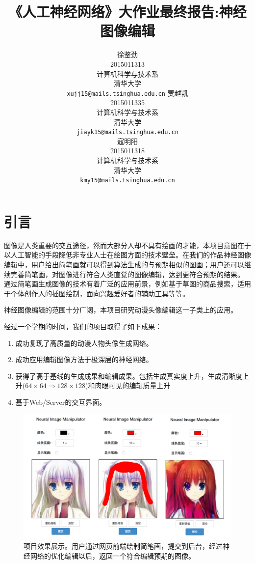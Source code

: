 \documentclass[a4paper,12pt,UTF8]{ctexart}
\title{《人工神经网络》大作业最终报告:神经图像编辑}
\author{
  徐鉴劲 \\
  2015011313 \\
  计算机科学与技术系 \\
  清华大学 \\
  \texttt{xujj15@mails.tsinghua.edu.cn}
  \AND
  贾越凯 \\
  2015011335 \\
  计算机科学与技术系 \\
  清华大学 \\
  \texttt{jiayk15@mails.tsinghua.edu.cn} \\
  \AND
  寇明阳 \\
  2015011318 \\
  计算机科学与技术系 \\
  清华大学 \\
  \texttt{kmy15@mails.tsinghua.edu.cn} \\
}
\newcommand{\kai}{\CJKfamily{zhkai}}	%
\begin{document}
\maketitle

\begin{abstract}

\end{abstract}


\section{引言}

图像是人类重要的交互途径，然而大部分人却不具有绘画的才能，本项目意图在于以人工智能的手段降低非专业人士在绘图方面的技术壁垒。在我们的作品神经图像编辑中，用户给出简笔画就可以得到算法生成的与预期相似的图画；用户还可以继续完善简笔画，对图像进行符合人类直觉的图像编辑，达到更符合预期的结果。
通过简笔画生成图像的技术有着广泛的应用前景，例如基于草图的商品搜索，适用于个体创作人的插图绘制，面向兴趣爱好者的辅助工具等等。

神经图像编辑的范围十分广阔，本项目研究动漫头像编辑这一子类上的应用。

经过一个学期的时间，我们的项目取得了如下成果：

\begin{enumerate}
\item 成功复现了高质量的动漫人物头像生成网络。
\item 成功应用编辑图像方法于极深层的神经网络。
\item 获得了高于基线的生成成果和编辑成果。包括生成真实度上升，生成清晰度上升($64 \times 64 \Rightarrow 128 \times 128$)和肉眼可见的编辑质量上升
\item 基于Web/Server的交互界面。
\end{enumerate}

\begin{figure}[H]
  \centering
  \includegraphics[width=0.9\linewidth]{figs/frontend.png}
  \caption{\kai 项目效果展示。用户通过网页前端绘制简笔画，提交到后台，经过神经网络的优化编辑以后，返回一个符合编辑预期的图像。}
  \label{fig:frontend}
\end{figure}
\end{document}
